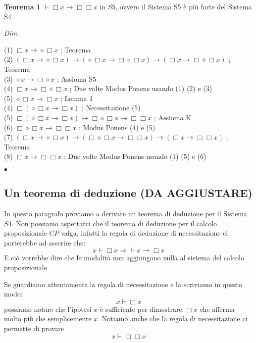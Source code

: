 \documentclass[a4paper, 12pt]{article}
\begin{document}
\begin{flushleft}
\textbf{Teorema 1}
$\vdash \Box x \rightarrow \Box \Box x$ in $S5$, ovvero il Sistema S5 è più forte del Sistema S4.

\textit{Dim.}

(1) $\Box x \rightarrow \diamond \Box x$ ; Teorema \\
(2) $(\Box x \rightarrow \diamond \Box x) \rightarrow (\diamond \Box x \rightarrow \Box\diamond\Box x) \rightarrow (\Box x \rightarrow \Box \diamond \Box x)$ ; Teorema \\
(3) $\diamond x \rightarrow \Box \diamond x$ ; Assioma S5 \\
(4) $\Box x \rightarrow \Box \diamond \Box x$ ; Due volte Modus Ponens usando (1) (2) e (3) \\
(5) $\diamond \Box x \rightarrow \Box x$ ; Lemma 1 \\
(4) $\Box (\diamond \Box x \rightarrow \Box x)$ ; Necessitazione (5) \\
(5) $\Box(\diamond\Box x \rightarrow \Box x) \rightarrow \Box \diamond \Box x \rightarrow \Box \Box x$ ; Assioma K \\
(6) $\Box\diamond\Box x \rightarrow \Box\Box x$ ; Modus Ponens (4) e (5) \\
(7) $(\Box x \rightarrow \diamond \Box x) \rightarrow (\Box\diamond\Box x \rightarrow \Box\Box x) \rightarrow (\Box x \rightarrow \Box\Box x)$ ; Teorema \\
(8) $\Box x \rightarrow \Box \Box x$ ; Due volte Modus Ponens usando (1) (5) e (6)

\begin{flushright}$\bullet$\end{flushright}
\end{flushleft}

\subsection{Un teorema di deduzione (DA AGGIUSTARE)}
In questo paragrafo proviamo a derivare un teorema di deduzione per il Sistema $S4$.
Non possiamo aspettarci che il teorema di deduzione per il calcolo proposizionale $CP$ valga,
infatti la regola di deduzione di necessitazione ci porterebbe ad asserire che:
$$ x \vdash \Box x \Rightarrow \vdash x \rightarrow \Box x $$
E ciò vorrebbe dire che le modalità non aggiungono nulla al sistema del calcolo proposizionale.

Se guardiamo attentamente la regola di necessitazione e la scriviamo in questo modo:
$$x \vdash \Box x$$
possiamo notare che l'ipotesi $x$ è sufficiente per dimostrare $\Box x$ che afferma molto più
che semplicemente $x$.
Notiamo anche che la regola di necessitazione ci permette di provare
$$x \vdash \Box \Box x$$
\end{document}
